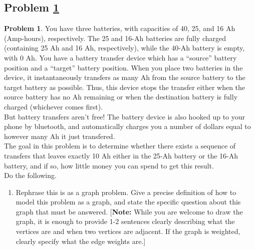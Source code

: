 \documentclass[11pt]{article}
\theoremstyle{definition}
\theoremstyle{definition}
\newtheorem{required}{Problem}
\theoremstyle{definition}
\begin{document}
\newpage
\subsection{Problem \ref{Dijkstra2}} 
\begin{required} \label{Dijkstra2}
You have three batteries, with capacities of 40, 25, and 16 Ah (Amp-hours), respectively. The 25 and 16-Ah batteries are fully charged (containing 25 Ah and 16 Ah, respectively), while the 40-Ah battery is empty, with 0 Ah. You have a battery transfer device which has a ``source'' battery position and a ``target'' battery position. When you place two batteries in the device, it instantaneously transfers as many Ah from the source battery to the target battery as possible. Thus, this device stops the transfer either when the source battery has no Ah remaining or when the destination battery is fully charged (whichever comes first).  \\

\noindent But battery transfers aren't free! The battery device is also hooked up to your phone by bluetooth, and automatically charges you a number of dollars equal to however many Ah it just transfered.  \\
	
\noindent The goal in this problem is to determine whether there exists a sequence of transfers that leaves exactly 10 Ah either in the 25-Ah battery or the 16-Ah battery, and if so, how little money you can spend to get this result. \\

\noindent Do the following.
\begin{enumerate}[label=(\alph*)]
\subsubsection{Problem 6\ref{Dijkstra2a}}
\item \label{Dijkstra2a} Rephrase this is as a graph problem. Give a precise definition of how to model this problem as a graph, and state the specific question about this graph that must be answered. [\textbf{Note:} While you are welcome to draw the graph, it is enough to provide 1-2 sentences clearly describing what the vertices are and when two vertices are adjacent. If the graph is weighted, clearly specify what the edge weights are.]


\end{enumerate}
\end{required}
\end{document}
